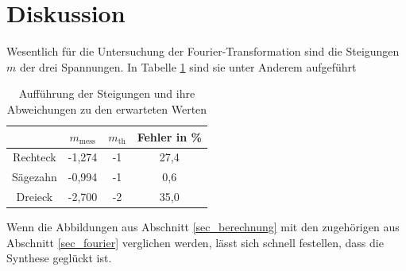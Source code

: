 \section{Diskussion}
Wesentlich für die Untersuchung der Fourier-Transformation sind die Steigungen $m$ der drei Spannungen. In Tabelle \ref{tab_diskus}
sind sie unter Anderem aufgeführt
\begin{table}[H]
 \begin{tabular}{c|c|c|c}
&  	$m_{\text{mess}}$&	$m_{\text{th}}$&	Fehler in \% \\
\hline
Rechteck&	-1,274&	-1&	27,4\\
Sägezahn&	-0,994&	-1&	0,6\\
Dreieck&	-2,700&	-2&	35,0
 \end{tabular}
\caption{Aufführung der Steigungen und ihre Abweichungen zu den erwarteten Werten}
\label{tab_diskus}
\end{table}



Wenn die Abbildungen aus Abschnitt \ref{sec_berechnung} mit den zugehörigen aus Abschnitt \ref{sec_fourier} verglichen werden, lässt
sich schnell festellen, dass die Synthese geglückt ist.








